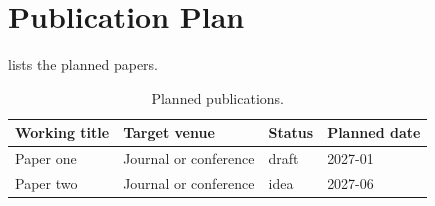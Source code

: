 \chapter{Publication Plan}
\label{ch:publication-plan}

 lists the planned papers.

\begin{table}[tb]
  \centering
  \caption{Planned publications.}
  \label{tab:publication-plan}
  \begin{tabular}{@{}llll@{}}
    \toprule
    Working title & Target venue & Status & Planned date \\
    \midrule
    Paper one & Journal or conference & draft & 2027-01 \\
    Paper two & Journal or conference & idea & 2027-06 \\
    \bottomrule
  \end{tabular}
\end{table}
